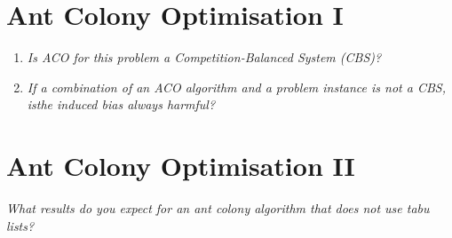 \documentclass{article}
\begin{document}
\section{Ant Colony Optimisation I}
\begin{enumerate}[label=\alph*)]
    \item \textit{Is ACO for this problem a Competition-Balanced System (CBS)?} \\ 
    
    \item \textit{If a combination of an ACO algorithm and a problem instance is not a CBS, isthe induced bias always harmful? } \\

\end{enumerate}

\section{Ant Colony Optimisation II}
\textit{What results do you expect for an ant colony algorithm that does not use tabu lists?} \\
\end{document}
